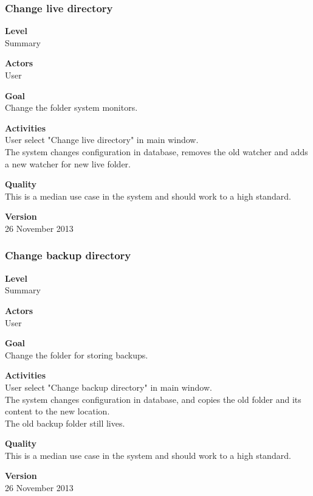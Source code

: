 \documentclass[12pt,a4paper]{article}
\begin{document}
\subsubsection{Change live directory}
\begin{description}
	\item \textbf{Level} \\
	Summary
	\item \textbf{Actors} \\
	User
	\item \textbf{Goal} \\
	Change the folder system monitors.
	\item \textbf{Activities} \\
	User select "Change live directory" in main window.\\
	The system changes configuration in database, removes the old watcher and adds a new watcher for new live folder.\\
	\item \textbf{Quality} \\
	This is a median use case in the system and should work to a high standard.
	\item \textbf{Version} \\
	26 November 2013	
\end{description}

\subsubsection{Change backup directory}
\begin{description}
	\item \textbf{Level} \\
	Summary
	\item \textbf{Actors} \\
	User
	\item \textbf{Goal} \\
	Change the folder for storing backups.
	\item \textbf{Activities} \\
	User select "Change backup directory" in main window.\\
	The system changes configuration in database, and copies the old folder and its content to the new location.\\
	The old backup folder still lives.
	\item \textbf{Quality} \\
	This is a median use case in the system and should work to a high standard.
	\item \textbf{Version} \\
	26 November 2013
\end{description}
\end{document}
